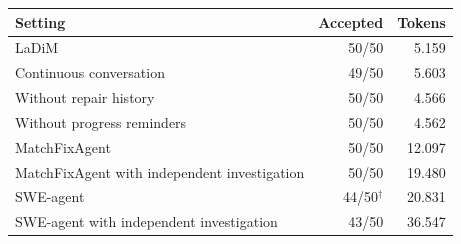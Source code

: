 \begin{tabular*}{\linewidth}{@{\extracolsep{\fill}}lrr@{}}
\toprule
\textbf{Setting} & \textbf{Accepted} & \textbf{Tokens} \\
\midrule
LaDiM & 50/50 & 5.159 \\
Continuous conversation & 49/50 & 5.603 \\
Without repair history & 50/50 & 4.566 \\
Without progress reminders & 50/50 & 4.562 \\
MatchFixAgent & 50/50 & 12.097 \\
MatchFixAgent with independent investigation & 50/50 & 19.480 \\
SWE-agent & 44/50$^{\dagger}$ & 20.831 \\
SWE-agent with independent investigation & 43/50 & 36.547 \\
\bottomrule
\end{tabular*}
